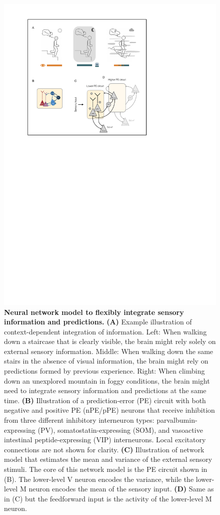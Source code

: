 \documentclass[10pt,a4paper]{article}
\begin{document}
%
\begin{figure}[t!]
	\centering
    \includegraphics{../results/figures/final/Fig_1}
\caption{\footnotesize{\bf Neural network model to flexibly integrate sensory information and predictions.\newline} 
{\bf (A)} Example illustration of context-dependent integration of information. Left: When walking down a staircase that is clearly visible, the brain might rely solely on external sensory information. Middle: When walking down the same stairs in the absence of visual information, the brain might rely on predictions formed by previous experience. Right: When climbing down an unexplored mountain in foggy conditions, the brain might need to integrate sensory information and predictions at the same time.
{\bf (B)} Illustration of a prediction-error (PE) circuit with both negative and positive PE (nPE/pPE) neurons that receive inhibition from three different inhibitory interneuron types: parvalbumin-expressing (PV), somatostatin-expressing (SOM), and vasoactive intestinal peptide-expressing (VIP) interneurons. Local excitatory connections are not shown for clarity.
{\bf (C)} Illustration of network model that estimates the mean and variance of the external sensory stimuli. The core of this network model is the PE circuit shown in (B). The lower-level V neuron encodes the variance, while the lower-level M neuron encodes the mean of the sensory input.
{\bf (D)} Same as in (C) but the feedforward input is the activity of the lower-level M neuron.
}
\label{fig:Fig_1}
\end{figure}
%
\end{document}
